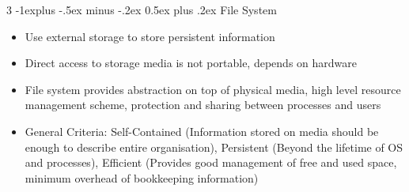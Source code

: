 \documentclass[10pt, landscape]{article}
\makeatletter
\renewcommand{\section}{\@startsection{section}{1}{0mm}%
                                {-1ex plus -.5ex minus -.2ex}%
                                {0.5ex plus .2ex}%
                                {\normalfont\large\bfseries}}
\renewcommand{\section}{\@startsection{section}{2}{0mm}%
                                {-1explus -.5ex minus -.2ex}%
                                {0.5ex plus .2ex}%
                                {\normalfont\normalsize\bfseries}}
\makeatother
\begin{document}
\begin{multicols*}{3}
\section{File System}
\begin{itemize}
    \item Use external storage to store persistent information
    \item Direct access to storage media is not portable, depends on hardware
    \item File system provides abstraction on top of physical media, high level resource management scheme, protection and sharing between processes and users
    \item General Criteria: Self-Contained (Information stored on media should be enough to describe entire organisation), Persistent (Beyond the lifetime of OS and processes), Efficient (Provides good management of free and used space, minimum overhead of bookkeeping information)
\end{itemize}


\end{multicols*}
\end{document}
